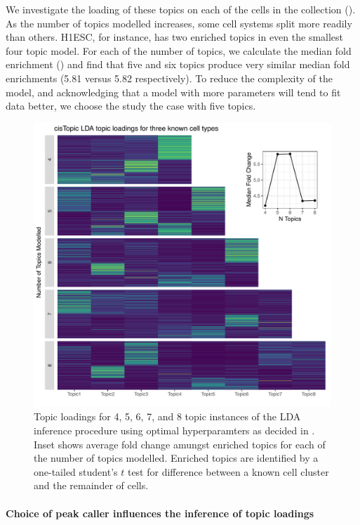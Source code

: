 We investigate the loading of these topics on each of the cells in the collection (). As the number of topics modelled increases, some cell systems split more readily than others. H1ESC, for instance, has two enriched topics in even the smallest four topic model. For each of the number of topics, we calculate the median fold enrichment () and find that five and six topics produce very similar median fold enrichments (5.81 versus 5.82 respectively). To reduce the complexity of the model, and acknowledging that a model with more parameters will tend to fit data better, we choose the study the case with five topics.  

\begin{figure}
  \centering
  \includegraphics[width=\textwidth]{plot/ch4/sc_topics.pdf}
  \caption{Topic loadings for 4, 5, 6, 7, and 8 topic instances of the LDA inference procedure using optimal hyperparamters as decided in . Inset shows average fold change amungst enriched topics for each of the number of topics modelled. Enriched topics are identified by a one-tailed student's $t$ test for difference between a known cell cluster and the remainder of cells.} 
  \label{fig:sc_topics}
\end{figure}

\paragraph{Choice of peak caller influences the inference of topic loadings}

